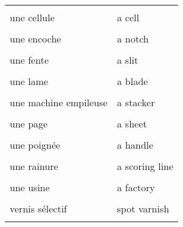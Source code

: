 \documentclass[
  10pt,
]{article}
\begin{document}
\begin{longtable}{ll}
\cellcolor{gray!6}{une caractéristique, une spécification} & \cellcolor{gray!6}{a feature}\\

une cellule & a cell\\

\cellcolor{gray!6}{une couche} & \cellcolor{gray!6}{a layer}\\

une encoche & a notch\\

\cellcolor{gray!6}{une entreprise} & \cellcolor{gray!6}{a company}\\

une fente & a slit\\

\cellcolor{gray!6}{une forme} & \cellcolor{gray!6}{a shape}\\

une lame & a blade\\

\cellcolor{gray!6}{une livraison} & \cellcolor{gray!6}{a delivery}\\

une machine empileuse & a stacker\\

\cellcolor{gray!6}{une nuance de couleur} & \cellcolor{gray!6}{a hue}\\

une page & a sheet\\

\cellcolor{gray!6}{une plaque} & \cellcolor{gray!6}{a plate}\\

une poignée & a handle\\

\cellcolor{gray!6}{une police (de caractères)} & \cellcolor{gray!6}{a font}\\

une rainure & a scoring line\\

\cellcolor{gray!6}{une récompense, un prix} & \cellcolor{gray!6}{a prize}\\

une usine & a factory\\

\cellcolor{gray!6}{une étape} & \cellcolor{gray!6}{a step}\\

vernis sélectif & spot varnish\\

\cellcolor{gray!6}{vif (couleur)} & \cellcolor{gray!6}{bright}\\


\end{longtable}
\end{document}
